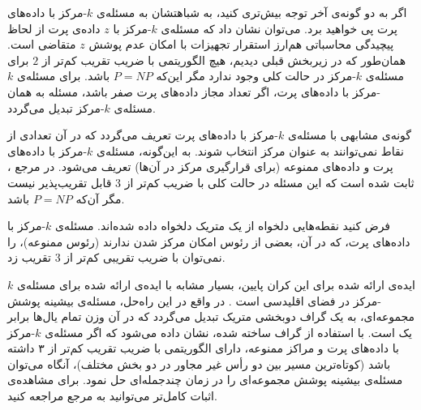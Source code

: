 





اگر به دو گونه‌ی آخر توجه بیش‌تری کنید، به شباهتشان به مسئله‌ی $k$-مرکز با داده‌های پرت پی خواهید برد.
می‌توان نشان داد که مسئله‌ی $k$-مرکز با $z$ داده‌ی پرت از لحاظ پیچیدگی محاسباتی هم‌ارز استقرار تجهیزات با امکان عدم پوشش $z$ متقاضی است.
همان‌طور که در زیربخش قبلی دیدیم، هیچ الگوریتمی با ضریب تقریب کم‌تر از $2$ برای مسئله‌ی $k$-مرکز در حالت کلی وجود ندارد مگر این‌که $P = NP$ باشد.
برای مسئله‌ی $k$-مرکز با داده‌های پرت، اگر تعداد مجاز داده‌های پرت صفر باشد، مسئله به همان مسئله‌ی $k$-مرکز تبدیل می‌گردد.

گونه‌ی مشابهی با مسئله‌ی $k$-مرکز با داده‌های پرت تعریف می‌گردد که در آن تعدادی از نقاط نمی‌توانند به عنوان مرکز انتخاب شوند.
به این‌گونه، مسئله‌ی $k$-مرکز با داده‌های پرت و داده‌های ممنوعه (برای قرارگیری مرکز در آن‌ها) تعریف می‌شود.
در مرجع ، ثابت شده است که این مسئله در حالت کلی با ضریب کم‌تر از $3$ قابل تقریب‌پذیر نیست مگر آن‌که $P = NP$ باشد. 


فرض کنید نقطه‌هایی دلخواه از یک متریک دلخواه داده شده‌اند.
مسئله‌ی $k$-مرکز با داده‌های پرت، که در آن، بعضی از رئوس امکان مرکز شدن ندارند (رئوس ممنوعه)، را نمی‌توان با ضریب تقریبی کم‌تر از $3$ تقریب زد.


ایده‌ی ارائه شده برای این کران پایین، بسیار مشابه با ایده‌ی ارائه شده برای مسئله‌ی $k$-مرکز در فضای اقلیدسی است .
در واقع در این راه‌حل، مسئله‌ی بیشینه پوشش مجموعه‌ای، به یک گراف دوبخشی متریک تبدیل می‌گردد که در آن وزن تمام یال‌ها برابر یک است.
با استفاده از گراف ساخته شده، نشان داده می‌شود که اگر مسئله‌ی $k$-مرکز با داده‌های پرت و مراکز ممنوعه، دارای الگوریتمی با ضریب تقریب کم‌تر از ۳ داشته باشد (کوتاه‌ترین مسیر بین دو رأس غیر مجاور در دو بخش مختلف)، آنگاه می‌توان مسئله‌ی بیشینه پوشش مجموعه‌ای را در زمان چندجمله‌ای حل نمود.
برای مشاهده‌ی اثبات کامل‌تر می‌توانید به مرجع  مراجعه کنید.


